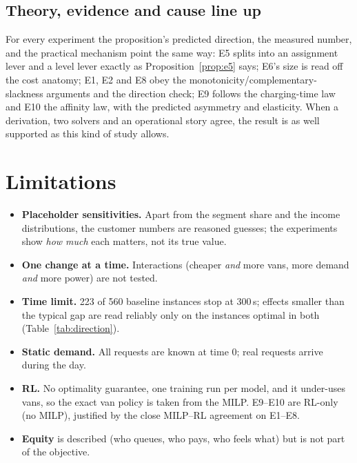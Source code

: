 \subsection{Theory, evidence and cause line up}
For every experiment the proposition's predicted direction, the measured number, and the practical mechanism point
the same way: E5 splits into an assignment lever and a level lever exactly as Proposition~\ref{prop:e5} says; E6's
size is read off the cost anatomy; E1, E2 and E8 obey the monotonicity/complementary-slackness arguments and the
direction check; E9 follows the charging-time law and E10 the affinity law, with the predicted asymmetry and
elasticity. When a derivation, two solvers and an operational story agree, the result is as well supported as this
kind of study allows.


\section{Limitations}
\label{sec:limits}
\begin{itemize}
  \item \textbf{Placeholder sensitivities.} Apart from the segment share and the income distributions, the customer
  numbers are reasoned guesses; the experiments show \emph{how much} each matters, not its true value.
  \item \textbf{One change at a time.} Interactions (cheaper \emph{and} more vans, more demand \emph{and} more
  power) are not tested.
  \item \textbf{Time limit.} 223 of 560 baseline instances stop at 300\,s; effects smaller than the typical gap are
  read reliably only on the instances optimal in both (Table~\ref{tab:direction}).
  \item \textbf{Static demand.} All requests are known at time 0; real requests arrive during the day.
  \item \textbf{RL.} No optimality guarantee, one training run per model, and it under-uses vans, so the exact van
  policy is taken from the MILP. E9--E10 are RL-only (no MILP), justified by the close MILP--RL agreement on E1--E8.
  \item \textbf{Equity} is described (who queues, who pays, who feels what) but is not part of the objective.
\end{itemize}

